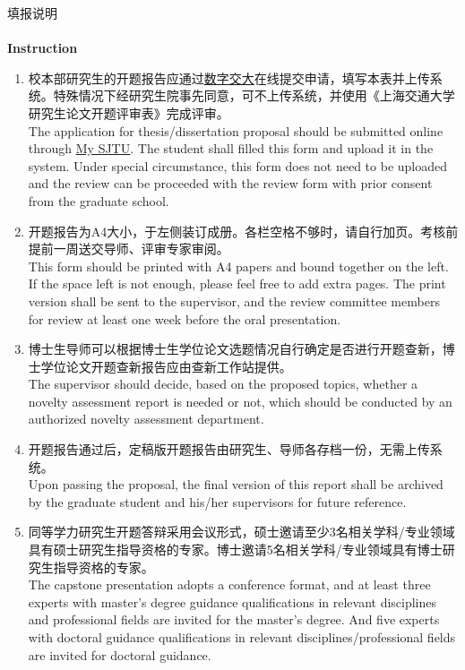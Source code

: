 \documentclass[zihao=-4,a4paper,AutoFakeBold]{ctexart}
\begin{document}
\clearpage


\begin{center}
    \vspace*{0.5cm}
    {\heiti 填\quad 报\quad 说\quad 明}\\~\\
    {\bfseries Instruction}
\end{center}

\begin{enumerate}
    \fangsong
    \item 校本部研究生的开题报告应通过\href{http://my.sjtu.edu.cn/}{\color{blue}\underline{数字交大}}在线提交申请，填写本表并上传系统。特殊情况下经研究生院事先同意，可不上传系统，并使用《上海交通大学研究生论文开题评审表》完成评审。\\[0.5\baselineskip]
          The application for thesis/dissertation proposal should be submitted online through \href{http://my.sjtu.edu.cn/}{\color{blue}\underline{My SJTU}}. The student shall filled this form and upload it in the system. Under special circumstance, this form does not need to be uploaded and the review can be proceeded with the review form with prior consent from the graduate school.

    \item 开题报告为A4大小，于左侧装订成册。各栏空格不够时，请自行加页。考核前提前一周送交导师、评审专家审阅。\\[0.5\baselineskip]
          This form should be printed with A4 papers and bound together on the left. If the space left is not enough, please feel free to add extra pages. The print version shall be sent to the supervisor, and the review committee members for review at least one week before the oral presentation.

    \item 博士生导师可以根据博士生学位论文选题情况自行确定是否进行开题查新，博士学位论文开题查新报告应由查新工作站提供。\\[0.5\baselineskip]
          The supervisor should decide, based on the proposed topics, whether a novelty assessment report is needed or not, which should be conducted by an authorized novelty assessment department.

    \item 开题报告通过后，定稿版开题报告由研究生、导师各存档一份，无需上传系统。\\[0.5\baselineskip]
          Upon passing the proposal, the final version of this report shall be archived by the graduate student and his/her supervisors for future reference.

    \item 同等学力研究生开题答辩采用会议形式，硕士邀请至少3名相关学科/专业领域具有硕士研究生指导资格的专家。博士邀请5名相关学科/专业领域具有博士研究生指导资格的专家。\\[0.5\baselineskip]
          The capstone presentation adopts a conference format, and at least three experts with master's degree guidance qualifications in relevant disciplines and professional fields are invited for the master's degree. And five experts with doctoral guidance qualifications in relevant disciplines/professional fields are invited for doctoral guidance.
\end{enumerate}
\end{document}
